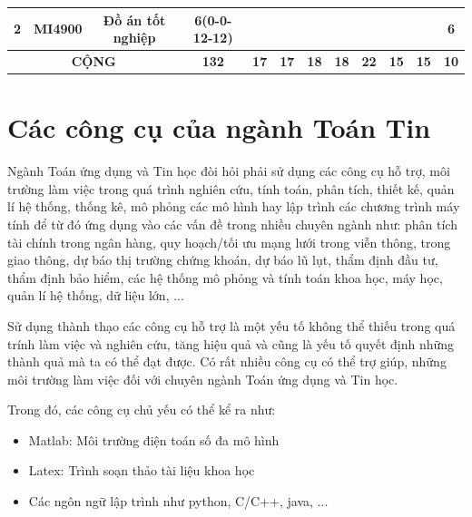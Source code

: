 \documentclass[12pt,a4paper]{report}
\begin{document}
\begin{landscape}
\begin{longtable}[c]{|c|c|c|c|c|c|c|c|c|c|c|c|}
        2                             & MI4900                          & Đồ án tốt nghiệp                                             & 6(0-0-12-12)                                                                         &             &             &             &             &             &             &             & 6           \\ \hline
        \multicolumn{3}{|c|}{\textbf{CỘNG}}                                                                                            & \textbf{132}                                                                         & \textbf{17} & \textbf{17} & \textbf{18} & \textbf{18} & \textbf{22} & \textbf{15} & \textbf{15} & \textbf{10} \\ \hline
        \end{longtable}
    \end{landscape}

    
    
    \chapter{Các công cụ của ngành Toán Tin}
    Ngành Toán ứng dụng và Tin học đòi hỏi phải sử dụng các công cụ hỗ trợ, môi trường làm việc trong quá trình nghiên cứu, tính toán, phân tích, thiết kế, quản lí hệ thống, thống kê, mô phỏng các mô hình hay lập trình các chương trình máy tính để từ đó ứng dụng vào các vấn đề trong nhiều chuyên ngành như: phân tích tài chính trong ngân hàng, quy hoạch/tối ưu mạng lưới trong viễn thông, trong giao thông, dự báo thị trường chứng khoán, dự báo lũ lụt, thẩm định đầu tư, thẩm định bảo hiểm, các hệ thống mô phỏng và tính toán khoa học, máy học, quản lí hệ thống, dữ liệu lớn, ...

    Sử dụng thành thạo các công cụ hỗ trợ là một yếu tố không thể thiếu trong quá trính làm việc và nghiên cứu, tăng hiệu quả và cũng là yếu tố quyết định những thành quả mà ta có thể đạt được. Có rất nhiều công cụ có thể trợ giúp, những môi trường làm việc đối với chuyên ngành Toán ứng dụng và Tin học.
    
    Trong đó, các công cụ chủ yếu có thể kể ra như: 
    \begin{itemize}
    \item Matlab: Môi trường điện toán số đa mô hình
    \item Latex: Trình soạn thảo tài liệu khoa học
    \item Các ngôn ngữ lập trình như python, C/C++, java, ...
    \end{itemize}
    
\end{document}
